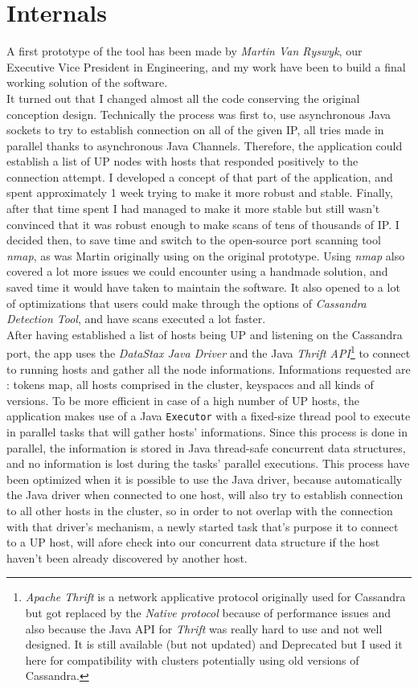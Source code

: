\documentclass[a4paper]{report}
\newcommand{\djd}{\emph{DataStax Java Driver\xspace}}
\begin{document}
\section{Internals}
A first prototype of the tool has been made by \emph{Martin Van Ryswyk}, our Executive Vice President in Engineering, and my work have been to build a final working solution of the software.\\
It turned out that I changed almost all the code conserving the original conception design. Technically the process was first to, use asynchronous Java sockets to try to establish connection on all of the given IP, all tries made in parallel thanks to asynchronous Java Channels. Therefore, the application could establish a list of UP nodes with hosts that responded positively to the connection attempt. I developed a concept of that part of the application, and spent approximately 1 week trying to make it more robust and stable. Finally, after that time spent I had managed to make it more stable but still wasn't convinced that it was robust enough to make scans of tens of thousands of IP. I decided then, to save time and switch to the open-source port scanning tool \emph{nmap}, as was Martin originally using on the original prototype. Using \emph{nmap} also covered a lot more issues we could encounter using a handmade solution, and saved time it would have taken to maintain the software. It also opened to a lot of optimizations that users could make through the options of \emph{Cassandra Detection Tool}, and have scans executed a lot faster.\\
After having established a list of hosts being UP and listening on the Cassandra port, the app uses the \djd{} and the Java \emph{Thrift API}\footnote{\emph{Apache Thrift} is a network applicative protocol originally used for Cassandra but got replaced by the \emph{Native protocol} because of performance issues and also because the Java API for \emph{Thrift} was really hard to use and not well designed. It is still available (but not updated) and Deprecated but I used it here for compatibility with clusters potentially using old versions of Cassandra.} to connect to running hosts and gather all the node informations. Informations requested are : tokens map, all hosts comprised in the cluster, keyspaces and all kinds of versions. To be more efficient in case of a high number of UP hosts, the application makes use of a Java \verb;Executor; with a fixed-size thread pool to execute in parallel tasks that will gather hosts' informations. Since this process is done in parallel, the information is stored in Java thread-safe concurrent data structures, and no information is lost during the tasks' parallel executions. This process have been optimized when it is possible to use the Java driver, because automatically the Java driver when connected to one host, will also try to establish connection to all other hosts in the cluster, so in order to not overlap with the connection with that driver's mechanism, a newly started task that's purpose it to connect to a UP host, will afore check into our concurrent data structure if the host haven't been already discovered by another host.
\end{document}
